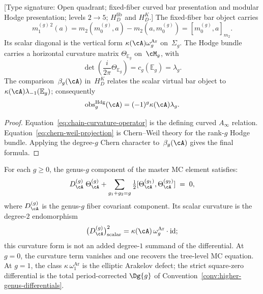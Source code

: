 \begin{proposition}
\label{prop:chain-level-curvature-operator}
\textup{[Type signature: Open quadrant; fixed-fiber curved bar
presentation and modular Hodge presentation; levels $2\to5$;
$H_D^{\mathrm{fib}}$ and $H_D^K$.]}
The fixed-fiber bar object carries
\begin{equation}
 m_1^{(g)\,2}(a)
 =m_2(m_0^{(g)},a)-m_2(a,m_0^{(g)})
 =[m_0^{(g)},a]_{m_2}.
 \label{eq:chain-curvature-operator}
\end{equation}
Its scalar diagonal is the vertical form
$\kappa(\cA)\omega_g^{\mathrm{Ar}}$ on~$\Sigma_g$.  The Hodge
bundle carries a horizontal curvature matrix
$\Theta_{\mathbb E_g}$ on~$\cM_g$, with
\begin{equation}
 \det\!\left(\frac{i}{2\pi}\Theta_{\mathbb E_g}\right)
 =c_g(\mathbb E_g)=\lambda_g.
 \label{eq:chern-weil-projection}
\end{equation}
The comparison~$\beta_g(\cA)$ in~$H_D^K$ relates the scalar virtual
bar object to~$\kappa(\cA)\lambda_{-1}(\mathbb E_g)$; consequently
\[
 \operatorname{obs}^{\mathrm{Hdg}}_g(\cA)
 =(-1)^g\kappa(\cA)\lambda_g.
\]
\end{proposition}

\begin{proof}
Equation~\eqref{eq:chain-curvature-operator} is the defining curved
$A_\infty$ relation.  Equation~\eqref{eq:chern-weil-projection} is
Chern--Weil theory for the rank-$g$ Hodge bundle.  Applying the
degree-$g$ Chern character to~$\beta_g(\cA)$ gives the final formula.
\end{proof}


\begin{proposition}
\label{prop:genus-g-mc-element}

For each $g \geq 0$, the genus-$g$ component of the master MC
element satisfies:
\[
D^{(g)}_\cA \;\Theta_\cA^{(g)}
+ \sum_{g_1+g_2=g}
\tfrac{1}{2}[\Theta_\cA^{(g_1)}, \Theta_\cA^{(g_2)}]
\;=\; 0,
\]
where $D^{(g)}_\cA$ is the genus-$g$ fiber covariant component. Its
scalar curvature is the degree-$2$ endomorphism
\[
\bigl(D^{(g)}_\cA\bigr)^2_{\mathrm{scalar}}
=\kappa(\cA)\,\omega_g^{\mathrm{Ar}}\cdot\mathrm{id};
\]
this curvature form is not an added degree-$1$ summand of the
differential. At $g = 0$, the curvature term vanishes and one recovers
the tree-level MC equation. At $g = 1$, the class
$\kappa\,\omega_1^{\mathrm{Ar}}$ is the elliptic Arakelov defect; the
strict square-zero differential is the total period-corrected
$\Dg{g}$ of Convention~\ref{conv:higher-genus-differentials}.
\end{proposition}

